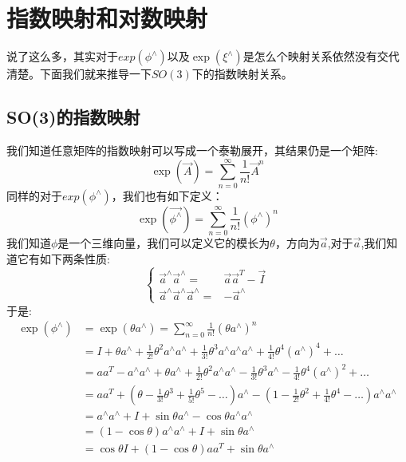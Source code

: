 \section{指数映射和对数映射}
说了这么多，其实对于$exp(\phi^\wedge)$以及$\exp(\xi^\wedge)$是怎么个映射关系依然没有交代清楚。下面我们就来推导一下$SO(3)$下的指数映射关系。
\subsection{SO(3)的指数映射}
我们知道任意矩阵的指数映射可以写成一个泰勒展开，其结果仍是一个矩阵:
\begin{equation}
	\exp(\vec{A})=\sum_{n=0}^{\infty}\frac{1}{n!}\vec{A}^n
\end{equation}
同样的对于$exp(\phi^\wedge)$，我们也有如下定义：
\begin{equation}
\exp(\vec{\phi^\wedge})=\sum_{n=0}^{\infty}\frac{1}{n!}(\phi^\wedge)^n
\end{equation}
我们知道$\phi$是一个三维向量，我们可以定义它的模长为$\theta$，方向为$\vec{a}$,对于$\vec{a}$,我们知道它有如下两条性质:
\begin{equation}
\left\{\begin{aligned}
	\vec{a}^\wedge\vec{a}^\wedge=&\vec{a}\vec{a}^T-\vec{I}\\
\vec{a}^\wedge\vec{a}^\wedge\vec{a}^\wedge=&-\vec{a}^\wedge
\end{aligned}\right.
\end{equation}
于是:
\begin{equation*}
\begin{aligned} 
\exp \left(\phi^{\wedge}\right) &=\exp \left(\theta a^{\wedge}\right)=\sum_{n=0}^{\infty} \frac{1}{n !}\left(\theta a^{\wedge}\right)^{n} \\
&=I+\theta a^{\wedge}+\frac{1}{2 !} \theta^{2} a^{\wedge} a^{\wedge}+\frac{1}{3 !} \theta^{3} a^{\wedge} a^{\wedge} a^{\wedge}+\frac{1}{4 !} \theta^{4}\left(a^{\wedge}\right)^{4}+\ldots\\
&=a a^{T}-a^{\wedge} a^{\wedge}+\theta a^{\wedge}+\frac{1}{2 !} \theta^{2} a^{\wedge} a^{\wedge}-\frac{1}{3 !} \theta^{3} a^{\wedge}-\frac{1}{4 !} \theta^{4}\left(a^{\wedge}\right)^{2}+\ldots \\ 
&=a a^{T}+\left(\theta-\frac{1}{3 !} \theta^{3}+\frac{1}{5 !} \theta^{5}-\dots\right) a^{\wedge}-\left(1-\frac{1}{2 !} \theta^{2}+\frac{1}{4 !} \theta^{4}-\ldots\right) a^{\wedge} a^{\wedge}\\
&=a^{\wedge} a^{\wedge}+I+\sin \theta a^{\wedge}-\cos \theta a^{\wedge} a^{\wedge}\\
&=(1-\cos \theta) a^{\wedge} a^{\wedge}+I+\sin \theta a^{\wedge} \\
&=\cos \theta I+(1-\cos \theta) a a^{T}+\sin \theta a^{\wedge}
\end{aligned}
\end{equation*}

